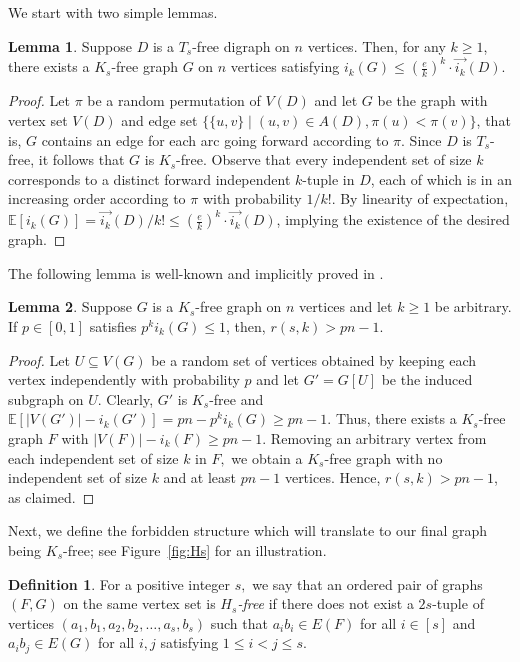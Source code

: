 \documentclass{article}
\theoremstyle{plain}
\newtheorem{lemma}[theorem]{Lemma}
\theoremstyle{definition}
\newtheorem{definition}[theorem]{Definition}
\newtheorem{definition}{Definition}
\newtheorem{lemma}{Lemma}
\DeclareMathOperator{\E}{\mathbb{E}}
\renewcommand{\E}{\mathbb{E}}
\newcommand{\fwi}[1]{\overrightarrow{i_{#1}}}
\begin{document}
We start with two simple lemmas.
\begin{lemma} \label{lem:Ts-free-Ks-free}
    Suppose $D$ is a $T_s$-free digraph on $n$ vertices. Then, for any $k \ge 1$, there exists a $K_s$-free graph $G$ on $n$ vertices satisfying $i_k(G) \le \left(\frac{e}{k} \right)^k \cdot \fwi{k}(D)$.
\end{lemma}
\begin{proof}
    Let $\pi$ be a random permutation of $V(D)$ and let $G$ be the graph with vertex set $V(D)$ and edge set $\{ \{u, v\} \mid (u, v) \in A(D), \pi(u) < \pi(v) \}$, that is, $G$ contains an edge for each arc going forward according to $\pi$. Since $D$ is $T_s$-free, it follows that $G$ is $K_s$-free. Observe that every independent set of size $k$ corresponds to a distinct forward independent $k$-tuple in $D$, each of which is in an increasing order according to $\pi$ with probability $1/k!$. By linearity of expectation, $\E[i_k(G)] = \fwi{k}(D) / k! \le \left( \frac{e}{k}\right)^k \cdot \fwi{k}(D)$, implying the existence of the desired graph.
\end{proof}

The following lemma is well-known and implicitly proved in \cite{mubayi-verstraete}.
\begin{lemma} \label{lem:sampling-Ks-free}
    Suppose $G$ is a $K_s$-free graph on $n$ vertices and let $k \ge 1$ be arbitrary. If $p \in [0, 1]$ satisfies $p^{k} i_k(G) \le 1$, then, $r(s, k) > pn - 1.$
\end{lemma}
\begin{proof}
    Let $U \subseteq V(G)$ be a random set of vertices obtained by keeping each vertex independently with probability $p$ and let $G' = G[U]$ be the induced subgraph on $U$. Clearly, $G'$ is $K_s$-free and $\E[ |V(G')| - i_k(G')] = p n - p^k i_k(G) \ge pn - 1$. Thus, there exists a $K_s$-free graph $F$ with $|V(F)| - i_k(F) \ge pn - 1$. Removing an arbitrary vertex from each independent set of size $k$ in $F,$ we obtain a $K_s$-free graph with no independent set of size $k$ and at least $pn - 1$ vertices. Hence, $r(s, k) > pn - 1$, as claimed.
\end{proof}

Next, we define the forbidden structure which will translate to our final graph being $K_s$-free; see Figure~\ref{fig:Hs} for an illustration.

\begin{definition} \label{def:Hs-free}
    For a positive integer $s,$ we say that an ordered pair of graphs $(F, G)$ on the same vertex set is \emph{$H_s$-free} if there does not exist a $2s$-tuple of vertices $(a_1, b_1, a_2, b_2, \dots, a_s, b_s)$ such that $a_i b_i \in E(F)$ for all $i \in [s]$ and $a_i b_j \in E(G)$ for all $i, j$ satisfying $1 \le i < j \le s$.
\end{definition}
\end{document}
